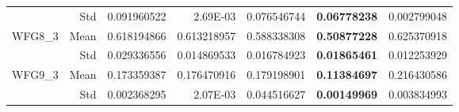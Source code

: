 \begin{table*}[htbp]
\begin{tabular}{rrrrrrr}
          & Std   & 0.091960522 & 2.69E-03 & \multicolumn{1}{c}{0.076546744} & \textbf{0.06778238} & 0.002799048 \\
    \multirow{2}[0]{*}{WFG8\_3} & Mean  & 0.618194866 & 0.613218957 & \multicolumn{1}{c}{0.588338308} & \textbf{0.50877228} & 0.625370918 \\
          & Std   & 0.029336556 & 0.014869533 & \multicolumn{1}{c}{0.016784923} & \textbf{0.01865461} & 0.012253929 \\
    \multirow{2}[0]{*}{WFG9\_3} & Mean  & 0.173359387 & 0.176470916 & \multicolumn{1}{c}{0.179198901} & \textbf{0.11384697} & 0.216430586 \\
          & Std   & 0.002368295 & 2.07E-03 & \multicolumn{1}{c}{0.044516627} & \textbf{0.00149969} & 0.003834993 \\
    \bottomrule
    \end{tabular}%
  \label{tab:wfg3igd}%
\end{table*}%
